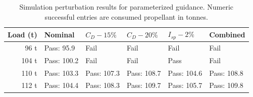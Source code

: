 \begin{table}[htbp]
\caption{Simulation perturbation results for parameterized guidance. Numeric successful entries are consumed propellant in tonnes.}
\label{tab:src16}
\small
\setlength{\tabcolsep}{3.5pt}
\begin{tabularx}{\linewidth}{@{}rXXXXX@{}}
\toprule
Load (t) & Nominal & $C_D-15\%$ & $C_D-20\%$ & $I_{sp}-2\%$ & Combined \\
\midrule
96 t & Pass: 95.9 & Fail & Fail & Fail & Fail \\
104 t & Pass: 100.2 & Fail & Fail & Pass & Fail \\
110 t & Pass: 103.3 & Pass: 107.3 & Pass: 108.7 & Pass: 104.6 & Pass: 108.8 \\
112 t & Pass: 104.4 & Pass: 108.3 & Pass: 109.7 & Pass: 105.7 & Pass: 109.8 \\
\bottomrule
\end{tabularx}
\end{table}

